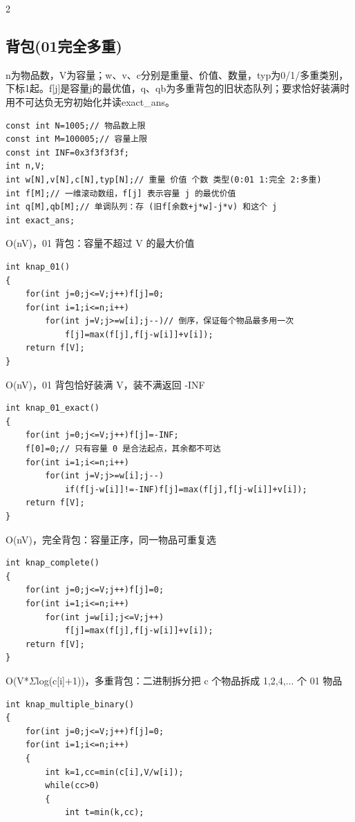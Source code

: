 \documentclass[UTF8,fontset=fandol,a4paper,twoside]{ctexart}
\newcommand{\note}[1]{{\fontsize{10}{12}\selectfont #1\par}}
\begin{document}
\begin{multicols}{2}
\subsection{背包(01完全多重)}

\note{n为物品数，V为容量；w、v、c分别是重量、价值、数量，typ为0/\allowbreak{}1/\allowbreak{}多重类别，下标1起。f[\allowbreak{}j]\allowbreak{}是容量j的最优值，q、qb为多重背包的旧状态队列；要求恰好装满时用不可达负无穷初始化并读exact\_ans。}
\begin{lstlisting}
const int N=1005;// 物品数上限
const int M=100005;// 容量上限
const int INF=0x3f3f3f3f;
int n,V;
int w[N],v[N],c[N],typ[N];// 重量 价值 个数 类型(0:01 1:完全 2:多重)
int f[M];// 一维滚动数组，f[j] 表示容量 j 的最优价值
int q[M],qb[M];// 单调队列：存 (旧f[余数+j*w]-j*v) 和这个 j
int exact_ans;
\end{lstlisting}
\note{O(\allowbreak{}nV)\allowbreak{}，01 背包：容量不超过 V 的最大价值}
\begin{lstlisting}
int knap_01()
{
    for(int j=0;j<=V;j++)f[j]=0;
    for(int i=1;i<=n;i++)
        for(int j=V;j>=w[i];j--)// 倒序，保证每个物品最多用一次
            f[j]=max(f[j],f[j-w[i]]+v[i]);
    return f[V];
}
\end{lstlisting}
\note{O(\allowbreak{}nV)\allowbreak{}，01 背包恰好装满 V，装不满返回 -\allowbreak{}INF}
\begin{lstlisting}
int knap_01_exact()
{
    for(int j=0;j<=V;j++)f[j]=-INF;
    f[0]=0;// 只有容量 0 是合法起点，其余都不可达
    for(int i=1;i<=n;i++)
        for(int j=V;j>=w[i];j--)
            if(f[j-w[i]]!=-INF)f[j]=max(f[j],f[j-w[i]]+v[i]);
    return f[V];
}
\end{lstlisting}
\note{O(\allowbreak{}nV)\allowbreak{}，完全背包：容量正序，同一物品可重复选}
\begin{lstlisting}
int knap_complete()
{
    for(int j=0;j<=V;j++)f[j]=0;
    for(int i=1;i<=n;i++)
        for(int j=w[i];j<=V;j++)
            f[j]=max(f[j],f[j-w[i]]+v[i]);
    return f[V];
}
\end{lstlisting}
\note{O(\allowbreak{}V*\ensuremath{\Sigma}log(\allowbreak{}c[\allowbreak{}i]\allowbreak{}+\allowbreak{}1)\allowbreak{})\allowbreak{}，多重背包：二进制拆分把 c 个物品拆成 1,\allowbreak{}2,\allowbreak{}4,\allowbreak{}.\allowbreak{}.\allowbreak{}.\allowbreak{} 个 01 物品}
\begin{lstlisting}
int knap_multiple_binary()
{
    for(int j=0;j<=V;j++)f[j]=0;
    for(int i=1;i<=n;i++)
    {
        int k=1,cc=min(c[i],V/w[i]);
        while(cc>0)
        {
            int t=min(k,cc);

\end{lstlisting}
\end{multicols}
\end{document}
